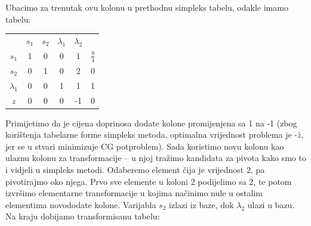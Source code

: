 \documentclass[a4paper, utf8, 11pt, colorlinks]{book}
\begin{document}
Ubacimo za trenutak ovu kolonu u prethodnu simpleks tabelu, odakle imamo tabelu: 

 \begin{center}
 	
 	\begin{tabular}{c|ccccc}
 	                &$s_1$        & $ s_2$   &  $\lambda_1$ & $\lambda_2$   &                \\
 		$s_1$	    &   1      &    0         &   0         &     1         &  $\frac{9}{4}$ \\
 		$s_2$	    &   0      &    1         &   0         &     2         &  0             \\
 		$\lambda_1$ &   0      &    0         &   1         &     1         &  1             \\ \hline
 		$z$         &   0      &    0         &   0         &    -1         &  0
 	\end{tabular}
 \end{center}
Primijetimo da je cijena doprinosa dodate kolone promijenjena sa 1 na -1 (zbog korištenja tabelarne forme simpleks metoda, optimalna vrijednost problema je -$\hat{z}$, jer se u stvari minimizuje CG potproblem). Sada koristimo novu kolonu kao ulaznu kolonu za transformacije -- u njoj tražimo kandidata za pivota kako smo to i vidjeli u simpleks metodi. Odaberemo element čija je vrijednost $2$, pa pivotirajmo oko njega. Prvo sve elemente u koloni 2 podijelimo sa 2, te potom izvršimo elementarne transformacije u kojima načinimo nule u ostalim elementima novododate kolone. Varijabla $s_2$ izlazi iz baze, dok $\lambda_2$ ulazi u bazu. Na kraju dobijamo transformisanu tabelu:
\end{document}
